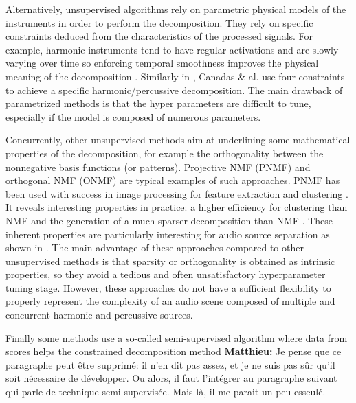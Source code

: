 \documentclass[journal]{IEEEtran}
\def\MK{\color{blue} {\bf Matthieu:} }
\begin{document}
Alternatively, unsupervised algorithms rely on parametric physical models of the instruments in order to perform the decomposition. They rely on specific constraints deduced from the characteristics of the processed signals. For example, harmonic instruments tend to have regular activations and are slowly varying over time so enforcing temporal smoothness improves the physical meaning of the decomposition \cite{Virtanen}. Similarly in \cite{canadas2014percussive}, Canadas \& al. use four constraints to achieve a specific harmonic/percussive decomposition. The main drawback of parametrized methods is that the hyper parameters are difficult to tune, especially if the model is composed of numerous parameters. 

Concurrently, other unsupervised methods aim at underlining some mathematical properties of the decomposition, for example the orthogonality between the nonnegative basis functions (or patterns). Projective NMF (PNMF) and orthogonal NMF (ONMF) are typical examples of such approaches. PNMF has been used with success in image processing \cite{choi} for feature extraction and clustering \cite{YangOja10}. It reveals interesting properties in practice: a higher efficiency for clustering than NMF \cite{choi} and the generation of a much sparser decomposition than NMF \cite{YangOja10}. These inherent properties are particularly interesting for audio source separation as shown in \cite{canadas2014percussive,vincent2010adaptive}. 
The main advantage of these approaches compared to other unsupervised methods is that sparsity or orthogonality is obtained as intrinsic properties, so they avoid a tedious and often unsatisfactory hyperparameter tuning stage. However, these approaches do not have a sufficient flexibility to properly represent the complexity of an audio scene composed of multiple and concurrent harmonic and percussive sources.


Finally some methods use a so-called semi-supervised algorithm where data from scores helps the constrained decomposition method \cite{hennequin2011score,fritsch2013score} {\MK Je pense que ce paragraphe peut être supprimé: il n'en dit pas assez, et je ne suis pas sûr qu'il soit nécessaire de développer. Ou alors, il faut l'intégrer au paragraphe suivant qui parle de technique semi-supervisée. Mais là, il me parait un peu esseulé.}
\end{document}
